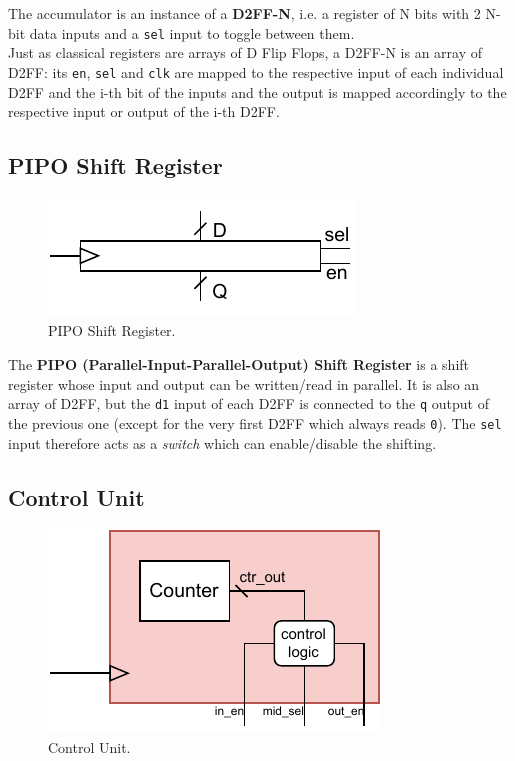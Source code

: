 The accumulator is an instance of a \textbf{D2FF-N}, i.e. a register of N bits with 2 N-bit data inputs and a \texttt{sel} input to toggle between them.\\
Just as classical registers are arrays of D Flip Flops, a D2FF-N is an array of D2FF: its \texttt{en}, \texttt{sel} and \texttt{clk} are mapped to the respective input of each individual D2FF and the i-th bit of the inputs and the output is mapped accordingly to the respective input or output of the i-th D2FF.

\subsection{PIPO Shift Register}\label{subsec:PIPOshiftreg}

\begin{figure}[H]
    \begin{center}
        \includegraphics[scale=1.1,clip]{img/PIPO_shiftreg_block.pdf}
    \end{center}
    \vspace*{-0.5cm}
    \caption{PIPO Shift Register.}
    \label{fig:PIPOshiftregblock}
\end{figure}
The \textbf{PIPO (Parallel-Input-Parallel-Output) Shift Register} is a shift register whose input and output can be written/read in parallel. It is also an array of D2FF, but the \texttt{d1} input of each D2FF is connected to the \texttt{q} output of the previous one (except for the very first D2FF which always reads \texttt{0}). The \texttt{sel} input therefore acts as a \textit{switch} which can enable/disable the shifting.

\subsection{Control Unit}\label{subsec:CU}
\begin{figure}[H]
    \begin{center}
        \includegraphics[scale=1.3,clip]{img/CU_block.pdf}
    \end{center}
    \vspace*{-0.5cm}
    \caption{Control Unit.}
    \label{fig:CUblock}
\end{figure}

